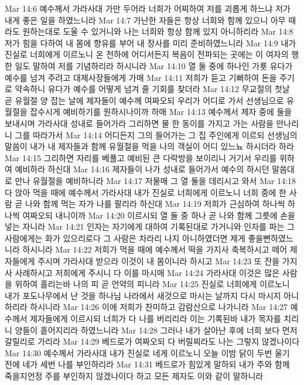 Mar 14:6  예수께서 가라사대 가만 두어라 너희가 어찌하여 저를 괴롭게 하느냐 저가 내게 좋은 일을 하였느니라
Mar 14:7  가난한 자들은 항상 너희와 함께 있으니 아무 때라도 원하는대로 도울 수 있거니와 나는 너희와 항상 함께 있지 아니하리라
Mar 14:8  저가 힘을 다하여 내 몸에 향유를 부어 내 장사를 미리 준비하였느니라
Mar 14:9  내가 진실로 너희에게 이르노니 온 천하에 어디서든지 복음이 전파되는 곳에는 이 여자의 행한 일도 말하여 저를 기념하리라 하시니라
Mar 14:10  열 둘 중에 하나인 가룟 유다가 예수를 넘겨 주려고 대제사장들에게 가매
Mar 14:11  저희가 듣고 기뻐하여 돈을 주기로 약속하니 유다가 예수를 어떻게 넘겨 줄 기회를 찾더라
Mar 14:12  무교절의 첫날 곧 유월절 양 잡는 날에 제자들이 예수께 여짜오되 우리가 어디로 가서 선생님으로 유월절을 잡수시게 예비하기를 원하시나이까 하매
Mar 14:13  예수께서 제자 중에 둘을 보내시며 가라사대 성내로 들어가라 그리하면 물 한 동이를 가지고 가는 사람을 만나리니 그를 따라가서
Mar 14:14  어디든지 그의 들어가는 그 집 주인에게 이르되 선생님의 말씀이 내가 내 제자들과 함께 유월절을 먹을 나의 객실이 어디 있느뇨 하시더라 하라
Mar 14:15  그리하면 자리를 베풀고 예비된 큰 다락방을 보이리니 거기서 우리를 위하여 예비하라 하신대
Mar 14:16  제자들이 나가 성내로 들어가서 예수의 하시던 말씀대로 만나 유월절을 예비하니라
Mar 14:17  저물매 그 열 둘을 데리시고 와서
Mar 14:18  다 앉아 먹을 때에 예수께서 가라사대 내가 진실로 너희에게 이르노니 너희 중에 한 사람 곧 나와 함께 먹는 자가 나를 팔리라 하신대
Mar 14:19  저희가 근심하여 하나씩 하나씩 여짜오되 내니이까
Mar 14:20  이르시되 열 둘 중 하나 곧 나와 함께 그릇에 손을 넣는 자니라
Mar 14:21  인자는 자기에게 대하여 기록된대로 가거니와 인자를 파는 그 사람에게는 화가 있으리로다 그 사람은 차라리 나지 아니하였더면 제게 좋을뻔하였느니라 하시니라
Mar 14:22  저희가 먹을 때에 예수께서 떡을 가지사 축복하시고 떼어 제자들에게 주시며 가라사대 받으라 이것이 내 몸이니라 하시고
Mar 14:23  또 잔을 가지사 사례하시고 저희에게 주시니 다 이를 마시매
Mar 14:24  가라사대 이것은 많은 사람을 위하여 흘리는바 나의 피 곧 언약의 피니라
Mar 14:25  진실로 너희에게 이르노니 내가 포도나무에서 난 것을 하나님 나라에서 새것으로 마시는 날까지 다시 마시지 아니하리라 하시니라
Mar 14:26  이에 저희가 찬미하고 감람산으로 나가니라
Mar 14:27  예수께서 제자들에게 이르시되 너희가 다 나를 버리리라 이는 기록된바 내가 목자를 치리니 양들이 흩어지리라 하였느니라
Mar 14:28  그러나 내가 살아난 후에 너희 보다 먼저 갈릴리로 가리라
Mar 14:29  베드로가 여짜오되 다 버릴찌라도 나는 그렇지 않겠나이다
Mar 14:30  예수께서 가라사대 내가 진실로 네게 이르노니 오늘 이밤 닭이 두번 울기 전에 네가 세번 나를 부인하리라
Mar 14:31  베드로가 힘있게 말하되 내가 주와 함께 죽을지언정 주를 부인하지 않겠나이다 하고 모든 제자도 이와 같이 말하니라
